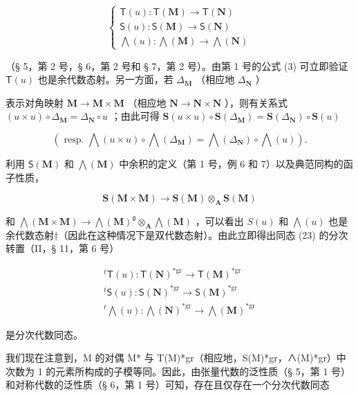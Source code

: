 \[
\left\{ \begin{array}{l} \mathsf {T} (u): \mathsf {T} (\mathbf {M}) \to \mathsf {T} (\mathbf {N}) \\ \mathsf {S} (u): \mathsf {S} (\mathbf {M}) \to \mathsf {S} (\mathbf {N}) \\ \bigwedge (u): \bigwedge (\mathbf {M}) \to \bigwedge (\mathbf {N}) \end{array} \right.\tag{23}
\]

（§ 5，第 2 号，§ 6，第 2 号和 § 7，第 2 号）。由第 1 号的公式 (3) 可立即验证 \(\mathsf{T}(u)\) 也是余代数态射。另一方面，若 \(\Delta_{\mathbf{M}}\) （相应地 \(\Delta_{\mathbf{N}}\) ）

表示对角映射 \(\mathbf{M} \to \mathbf{M} \times \mathbf{M}\) （相应地 \(\mathbf{N} \to \mathbf{N} \times \mathbf{N}\) ），则有关系式 \((u \times u) \circ \Delta_{\mathbf{M}} = \Delta_{\mathbf{N}} \circ u\) ；由此可得 \(\mathbf{S}(u \times u) \circ \mathbf{S}(\Delta_{\mathbf{M}}) = \mathbf{S}(\Delta_{\mathbf{N}}) \circ \mathbf{S}(u)\)

\[
(\text { resp. } \bigwedge (u \times u) \circ \bigwedge (\Delta_ {\mathbf {M}}) = \bigwedge (\Delta_ {\mathbf {N}}) \circ \bigwedge (u)).
\]

利用 \(\mathsf{S}(\mathbf{M})\) 和 \(\bigwedge (\mathbf{M})\) 中余积的定义（第 1 号，例 6 和 7）以及典范同构的函子性质，

\[
\mathbf {S} (\mathbf {M} \times \mathbf {M}) \rightarrow \mathbf {S} (\mathbf {M}) \otimes_ {\mathbf {A}} \mathbf {S} (\mathbf {M})
\]

和 \(\bigwedge (\mathbf{M}\times \mathbf{M})\to \bigwedge (\mathbf{M})^{\mathfrak{g}}\otimes_{\mathbf{A}}\bigwedge (\mathbf{M})\) ，可以看出 \(S(u)\) 和 \(\bigwedge (u)\) 也是余代数态射†（因此在这种情况下是双代数态射）。由此立即得出同态 (23) 的分次转置（II，§ 11，第 6 号）

\[
\begin{array}{c} ^ {t} \mathsf {T} (u): \mathsf {T} (\mathbf {N}) ^ {* \mathrm{gr}} \to \mathsf {T} (\mathbf {M}) ^ {* \mathrm{gr}} \\ ^ {t} \mathsf {S} (u): \mathsf {S} (\mathbf {N}) ^ {* \mathrm{gr}} \to \mathsf {S} (\mathbf {M}) ^ {* \mathrm{gr}} \\ ^ {t} \bigwedge (u): \bigwedge (\mathbf {N}) ^ {* \mathrm{gr}} \to \bigwedge (\mathbf {M}) ^ {* \mathrm{gr}} \end{array}
\]

是分次代数同态。

我们现在注意到，M 的对偶 M* 与 T(M)*gr（相应地，S(M)*gr，∧(M)*gr）中次数为 1 的元素所构成的子模等同。因此，由张量代数的泛性质（§ 5，第 1 号）和对称代数的泛性质（§ 6，第 1 号）可知，存在且仅存在一个分次代数同态


